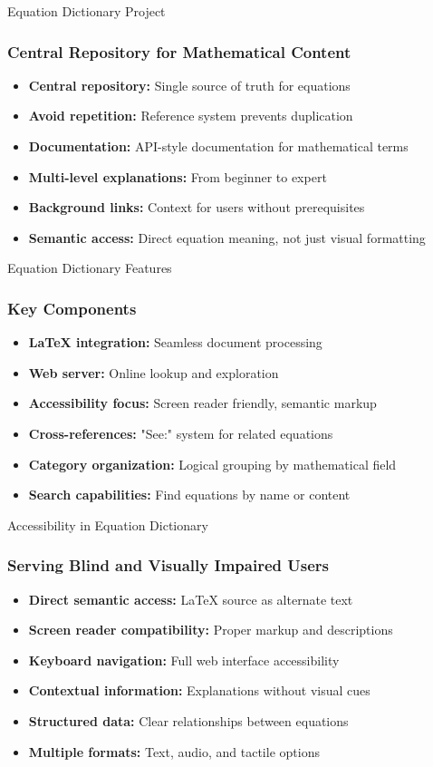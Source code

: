 \documentclass[aspectratio=169]{beamer}
\begin{document}
\begin{frame}[fragile]{Equation Dictionary Project}
\frametitle{Central Repository for Mathematical Content}
\begin{itemize}
\item \textbf{Central repository:} Single source of truth for equations
\item \textbf{Avoid repetition:} Reference system prevents duplication
\item \textbf{Documentation:} API-style documentation for mathematical terms
\item \textbf{Multi-level explanations:} From beginner to expert
\item \textbf{Background links:} Context for users without prerequisites
\item \textbf{Semantic access:} Direct equation meaning, not just visual formatting
\end{itemize}
\end{frame}

\begin{frame}[fragile]{Equation Dictionary Features}
\frametitle{Key Components}
\begin{itemize}
\item \textbf{LaTeX integration:} Seamless document processing
\item \textbf{Web server:} Online lookup and exploration
\item \textbf{Accessibility focus:} Screen reader friendly, semantic markup
\item \textbf{Cross-references:} "See:" system for related equations
\item \textbf{Category organization:} Logical grouping by mathematical field
\item \textbf{Search capabilities:} Find equations by name or content
\end{itemize}
\end{frame}

\begin{frame}[fragile]{Accessibility in Equation Dictionary}
\frametitle{Serving Blind and Visually Impaired Users}
\begin{itemize}
\item \textbf{Direct semantic access:} LaTeX source as alternate text
\item \textbf{Screen reader compatibility:} Proper markup and descriptions
\item \textbf{Keyboard navigation:} Full web interface accessibility
\item \textbf{Contextual information:} Explanations without visual cues
\item \textbf{Structured data:} Clear relationships between equations
\item \textbf{Multiple formats:} Text, audio, and tactile options
\end{itemize}
\end{frame}
\end{document}
